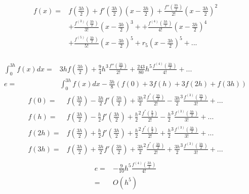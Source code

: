 \documentclass{article}
\begin{document}
    \section{}
        \paragraph{}
        \begin{equation*}
            \begin{split}
                f(x)=&f(\frac{3h}{2})+f'(\frac{3h}{2})(x-\frac{3h}{2})+\frac{f''(\frac{3h}{2})}{2!}(x-\frac{3h}{2})^2\\
                    &+\frac{f^{(3)}(\frac{3h}{2})}{3!}(x-\frac{3h}{2})^3++\frac{f^{(4)}(\frac{3h}{2})}{4!}(x-\frac{3h}{2})^4\\
                    &+\frac{f^{(5)}(\frac{3h}{2})}{5!}(x-\frac{3h}{2})^5+r_5(x-\frac{3h}{2})^5+...\\
            \end{split}
        \end{equation*}

        \begin{equation*}
            \begin{split}
                \int_0^{3h}f(x)dx=&3hf(\frac{3h}{2})+\frac{9}{4}h^3\frac{f''(\frac{3h}{2})}{2!}+\frac{243}{80}h^5\frac{f^{(4)}(\frac{3h}{2})}{4!}+...\\
                e=&\int_0^{3h}f(x)dx-\frac{3h}{8}(f(0)+3f(h)+3f(2h)+f(3h))
            \end{split}
        \end{equation*}
                \begin{equation*}
            \begin{split}
                f(0)=&f(\frac{3h}{2})-\frac{3h}{2}f'(\frac{3h}{2})+\frac{3h}{2} ^2\frac{f^{''}(\frac{3h}{2})}{2!}-\frac{3h}{2} ^3\frac{f^{(3)}(\frac{3h}{2})}{3!}+...\\
                f(h)=&f(\frac{3h}{2})-\frac{h}{2}f'(\frac{3h}{2})+\frac{h}{2} ^2\frac{f^{''}(\frac{h}{2})}{2!}-\frac{h}{2} ^3\frac{f^{(3)}(\frac{3h}{2})}{3!}+...\\
                f(2h)=&f(\frac{3h}{2})+\frac{h}{2}f'(\frac{3h}{2})+\frac{h}{2} ^2\frac{f^{''}(\frac{h}{2})}{2!}+\frac{h}{2} ^3\frac{f^{(3)}(\frac{3h}{2})}{3!}+...\\
                f(3h)=&f(\frac{3h}{2})+\frac{3h}{2}f'(\frac{3h}{2})+\frac{3h}{2} ^2\frac{f^{''}(\frac{3h}{2})}{2!}+\frac{3h}{2} ^3\frac{f^{(3)}(\frac{3h}{2})}{3!}+...\\
            \end{split}
        \end{equation*}
        \begin{equation*}
            \begin{split}
                e=&-\frac{9}{10}h^5\frac{f^{(4)}(\frac{3h}{2})}{4!}\\
                    =&O(h^5)
            \end{split}
        \end{equation*}
\end{document}
